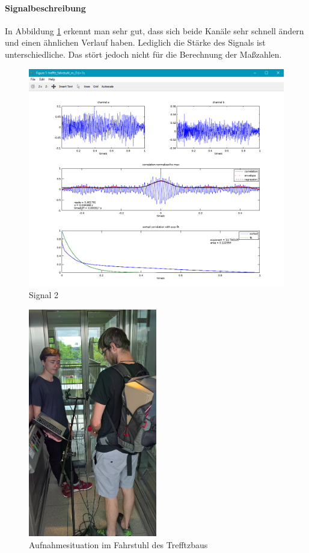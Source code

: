 \paragraph{Signalbeschreibung}
In Abbildung \ref{figure3}  erkennt man sehr gut, dass sich beide Kanäle sehr schnell ändern und einen ähnlichen Verlauf haben. Lediglich die Stärke des Signals ist unterschiedliche. Das stört jedoch nicht für die Berechnung der Maßzahlen. 
\begin{figure}[ht!]
  \centering
  \includegraphics[scale=0.64]{img/trefftz_fahrstuhl_m}
  \caption{Signal 2}
  \label{figure3}
\end{figure}

\begin{figure}[ht!]
  \centering
  \includegraphics[width=0.5\textwidth]{img/fahrstuhl}
  \caption{Aufnahmesituation im Fahrstuhl des Trefftzbaus}
  \label{figure4}
\end{figure}

